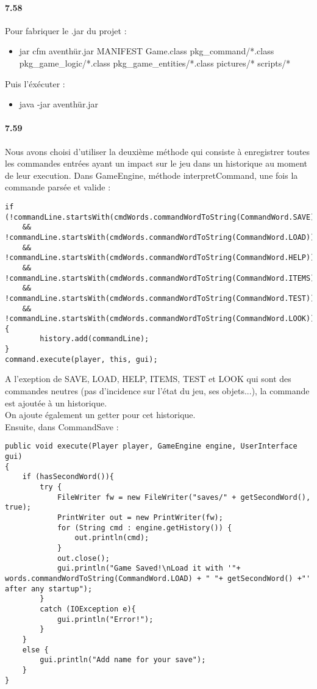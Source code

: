 \documentclass[11pt,a4paper]{report}
\begin{document}
\paragraph{7.58}
Pour fabriquer le .jar du projet :
\begin{itemize}
\item jar cfm aventhür.jar MANIFEST Game.class pkg\_command/*.class pkg\_game\_logic/*.class pkg\_game\_entities/*.class pictures/* scripts/*
\end{itemize}
Puis l'éxécuter :
\begin{itemize}
\item java -jar aventhür.jar
\end{itemize}

\paragraph{7.59}
Nous avons choisi d'utiliser la deuxième méthode qui consiste à enregistrer toutes les commandes entrées ayant un impact sur le jeu dans un historique au moment de leur execution. Dans GameEngine, méthode interpretCommand, une fois la commande parsée et valide : 
\begin{lstlisting}
if (!commandLine.startsWith(cmdWords.commandWordToString(CommandWord.SAVE))
    && !commandLine.startsWith(cmdWords.commandWordToString(CommandWord.LOAD))
    && !commandLine.startsWith(cmdWords.commandWordToString(CommandWord.HELP))
    && !commandLine.startsWith(cmdWords.commandWordToString(CommandWord.ITEMS))
    && !commandLine.startsWith(cmdWords.commandWordToString(CommandWord.TEST))
    && !commandLine.startsWith(cmdWords.commandWordToString(CommandWord.LOOK))) {
        history.add(commandLine);
}
command.execute(player, this, gui);
\end{lstlisting}
A l'exeption de SAVE, LOAD, HELP, ITEMS, TEST et LOOK qui sont des commandes neutres (pas d'incidence sur l'état du jeu, ses objets...), la commande est ajoutée à un historique.\\
On ajoute également un getter pour cet historique.\\
Ensuite, dans CommandSave :
\begin{lstlisting}
public void execute(Player player, GameEngine engine, UserInterface gui)
{
    if (hasSecondWord()){
        try {
            FileWriter fw = new FileWriter("saves/" + getSecondWord(), true);
            PrintWriter out = new PrintWriter(fw);
            for (String cmd : engine.getHistory()) {
                out.println(cmd);
            }
            out.close();
            gui.println("Game Saved!\nLoad it with '"+ words.commandWordToString(CommandWord.LOAD) + " "+ getSecondWord() +"' after any startup");
        }
        catch (IOException e){
            gui.println("Error!");
        }
    }
    else {
        gui.println("Add name for your save");
    }
}
\end{lstlisting}
\end{document}
